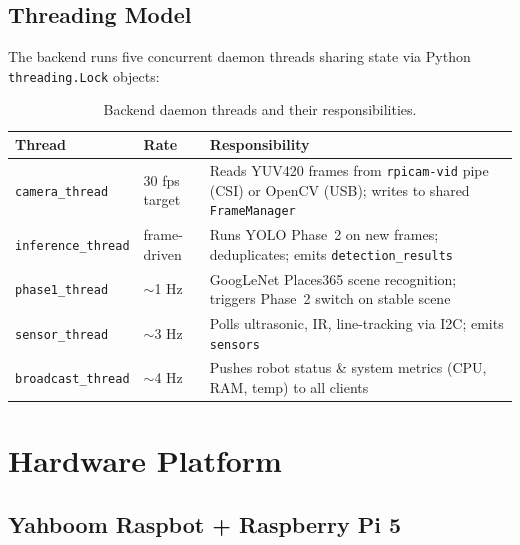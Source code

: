 \documentclass[12pt,a4paper]{article}
\begin{document}
\subsection{Threading Model}

The backend runs five concurrent daemon threads sharing state via Python
\texttt{threading.Lock} objects:

\begin{table}[H]
\centering
\caption{Backend daemon threads and their responsibilities.}
\label{tab:threads}
\begin{tabularx}{\linewidth}{@{}llX@{}}
\toprule
\textbf{Thread} & \textbf{Rate} & \textbf{Responsibility} \\
\midrule
\texttt{camera\_thread}    & 30 fps target & Reads YUV420 frames from \texttt{rpicam-vid} pipe (CSI) or OpenCV (USB); writes to shared \texttt{FrameManager} \\
\texttt{inference\_thread} & frame-driven  & Runs YOLO Phase~2 on new frames; deduplicates; emits \texttt{detection\_results} \\
\texttt{phase1\_thread}    & $\sim$1 Hz    & GoogLeNet Places365 scene recognition; triggers Phase~2 switch on stable scene \\
\texttt{sensor\_thread}    & $\sim$3 Hz    & Polls ultrasonic, IR, line-tracking via I2C; emits \texttt{sensors} \\
\texttt{broadcast\_thread} & $\sim$4 Hz    & Pushes robot status \& system metrics (CPU, RAM, temp) to all clients \\
\bottomrule
\end{tabularx}
\end{table}

\section{Hardware Platform}

\subsection{Yahboom Raspbot + Raspberry Pi 5}
\end{document}
